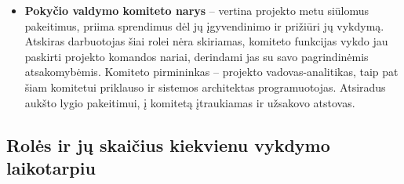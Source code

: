 \begin{itemize}
    \item \textbf{Pokyčio valdymo komiteto narys} -- vertina projekto metu siūlomus pakeitimus, priima sprendimus dėl jų įgyvendinimo ir prižiūri jų vykdymą. Atskiras darbuotojas šiai rolei nėra skiriamas, komiteto funkcijas vykdo jau paskirti projekto komandos nariai, derindami jas su savo pagrindinėmis atsakomybėmis. Komiteto pirmininkas -- projekto vadovas-analitikas, taip pat šiam komitetui priklauso ir sistemos architektas programuotojas. Atsiradus aukšto lygio pakeitimui, į komitetą įtraukiamas ir užsakovo atstovas.

\end{itemize}



\newpage
\subsection{Rolės ir jų skaičius kiekvienu vykdymo laikotarpiu}




